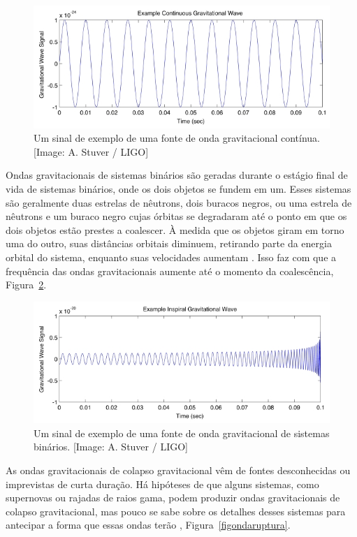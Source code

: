 \begin{figure}[ht]
\centering
\includegraphics[width=.9\textwidth]{figuras/continuous_tn.jpg}
\caption{Um sinal de exemplo de uma fonte de onda gravitacional contínua. [Image: A. Stuver / LIGO]}
\label{figondacontinua}
\end{figure}

Ondas gravitacionais de sistemas binários são geradas durante o estágio final de vida de sistemas binários, onde os dois objetos se fundem em um. Esses sistemas são geralmente duas estrelas de nêutrons, dois buracos negros, ou uma estrela de nêutrons e um buraco negro cujas órbitas se degradaram até o ponto em que os dois objetos estão prestes a coalescer. À medida que os objetos giram em torno uma do outro, suas distâncias orbitais diminuem, retirando parte da energia orbital do sistema, enquanto suas velocidades aumentam \cite{Liu_2018}. Isso faz com que a frequência das ondas gravitacionais aumente até o momento da coalescência, Figura~\ref{figondainspiral}.

\begin{figure}[ht]
\centering
\includegraphics[width=.9\textwidth]{figuras/inspiral_tn.jpg}
\caption{Um sinal de exemplo de uma fonte de onda gravitacional de sistemas binários. [Image: A. Stuver / LIGO]}
\label{figondainspiral}
\end{figure}

As ondas gravitacionais de colapso gravitacional vêm de fontes desconhecidas ou imprevistas de curta duração. Há hipóteses de que alguns sistemas, como supernovas ou rajadas de raios gama, podem produzir ondas gravitacionais de colapso gravitacional, mas pouco se sabe sobre os detalhes desses sistemas para antecipar a forma que essas ondas terão \cite{Christensen_2018}, Figura~\ref{figondaruptura}.

